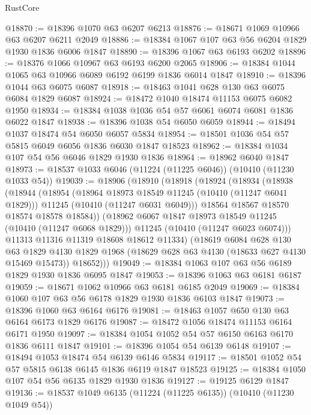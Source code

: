 \begin{lexlean}{RustCore}
\begin{coremodule}
@18870 := @18396 @1070 @63 @6207 @6213
@18876 := @18671 @1069 @10966 @63 @6207 @6211 @2049
@18886 := @18384 @1067 @107 @63 @56 @6204 @1829 @1930 @1836 @6006 @1847
@18890 := @18396 @1067 @63 @6193 @6202
@18896 := @18376 @1066 @10967 @63 @6193 @6200 @2065
@18906 := @18384 @1044 @1065 @63 @10966 @6089 @6192 @6199 @1836 @6014 @1847
@18910 := @18396 @1044 @63 @6075 @6087
@18918 := @18463 @1041 @628 @130 @63 @6075 @6084 @1829 @6087
@18924 := @18472 @1040 @18474 @11153 @6075 @6082 @1950
@18934 := @18384 @1038 @1036 @54 @57 @6061 @6074 @6081 @1836 @6022 @1847
@18938 := @18396 @1038 @54 @6050 @6059
@18944 := @18494 @1037 @18474 @54 @6050 @6057 @5834
@18954 := @18501 @1036 @54 @57 @5815 @6049 @6056 @1836 @6030 @1847 @18523
@18962 := @18384 @1034 @107 @54 @56 @6046 @1829 @1930 @1836
@18964 := @18962 @6040 @1847
@18973 := @18537 @1033 @6046 (@11224 (@11225 @6046)) (@10410 (@11230 @1033 @54))
@19039 := @18906
    (@18910
      (@18918
        (@18924
          (@18934
            (@18938
              (@18944
                (@18954
                  (@18964 @18973 @18549 @11245 (@10410 (@11247 @6041 @1829)))
                  @11245
                  (@10410 (@11247 @6031 @6049)))
                @18564
                @18567
                @18570
                @18574
                @18578
                @18584))
            (@18962 @6067 @1847 @18973 @18549 @11245 (@10410 (@11247 @6068 @1829)))
            @11245
            (@10410 (@11247 @6023 @6074)))
          @11313
          @11316
          @11319
          @18608
          @18612
          @11334)
        (@18619
          @6084
          @628
          @130
          @63
          @1829
          @4130
          @1829
          @1968
          (@18629 @628 @63 @4130 (@18633 @627 @4130 @15469 @15473))
          @18652)))
@19049 := @18384 @1063 @107 @63 @56 @6189 @1829 @1930 @1836 @6095 @1847
@19053 := @18396 @1063 @63 @6181 @6187
@19059 := @18671 @1062 @10966 @63 @6181 @6185 @2049
@19069 := @18384 @1060 @107 @63 @56 @6178 @1829 @1930 @1836 @6103 @1847
@19073 := @18396 @1060 @63 @6164 @6176
@19081 := @18463 @1057 @650 @130 @63 @6164 @6173 @1829 @6176
@19087 := @18472 @1056 @18474 @11153 @6164 @6171 @1950
@19097 := @18384 @1054 @1052 @54 @57 @6150 @6163 @6170 @1836 @6111 @1847
@19101 := @18396 @1054 @54 @6139 @6148
@19107 := @18494 @1053 @18474 @54 @6139 @6146 @5834
@19117 := @18501 @1052 @54 @57 @5815 @6138 @6145 @1836 @6119 @1847 @18523
@19125 := @18384 @1050 @107 @54 @56 @6135 @1829 @1930 @1836
@19127 := @19125 @6129 @1847
@19136 := @18537 @1049 @6135 (@11224 (@11225 @6135)) (@10410 (@11230 @1049 @54))

\end{coremodule}
\end{lexlean}
